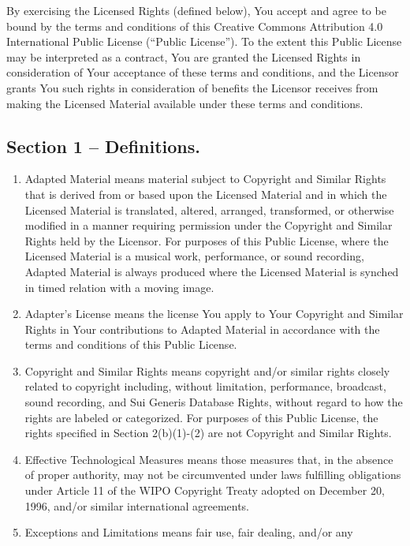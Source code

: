 By exercising the Licensed Rights (defined below), You accept and agree
to be bound by the terms and conditions of this Creative Commons
Attribution 4.0 International Public License (``Public License'').
To the extent this Public License may be interpreted as a contract, You are
granted the Licensed Rights in consideration of Your acceptance of these
terms and conditions, and the Licensor grants You such rights in
consideration of benefits the Licensor receives from making the Licensed
Material available under these terms and conditions.

\subsection*{Section 1 -- Definitions.}

\begin{enumerate}
\item
  Adapted Material means material subject to Copyright and Similar
  Rights that is derived from or based upon the Licensed Material and in
  which the Licensed Material is translated, altered, arranged,
  transformed, or otherwise modified in a manner requiring permission
  under the Copyright and Similar Rights held by the Licensor.
  For
  purposes of this Public License, where the Licensed Material is a
  musical work, performance, or sound recording, Adapted Material is
  always produced where the Licensed Material is synched in timed
  relation with a moving image.
\item
  Adapter's License means the license You apply to Your Copyright and
  Similar Rights in Your contributions to Adapted Material in accordance
  with the terms and conditions of this Public License.
\item
  Copyright and Similar Rights means copyright and/or similar rights
  closely related to copyright including, without limitation,
  performance, broadcast, sound recording, and Sui Generis Database
  Rights, without regard to how the rights are labeled or categorized.
  For purposes of this Public License, the rights specified in Section
  2(b)(1)-(2) are not Copyright and Similar Rights.
\item
  Effective Technological Measures means those measures that, in the
  absence of proper authority, may not be circumvented under laws
  fulfilling obligations under Article 11 of the WIPO Copyright Treaty
  adopted on December 20, 1996, and/or similar international agreements.
\item
  Exceptions and Limitations means fair use, fair dealing, and/or any

\end{enumerate}

